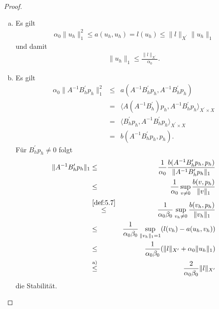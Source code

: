 \begin{proof}
    \begin{enumerate}[a)]
      \item
        Es gilt
        \begin{eqnarray*}
                \alpha_0 \|u_h\|_1^2
            \le a(u_h, u_h)
            = l(u_h)
            \le \|l\|_{X^\prime} \|u_h\|_1
        \end{eqnarray*}
        und damit
        \begin{eqnarray*}
            \|u_h\|_1 \le \frac{\|l\|_{X^\prime}}{\alpha_0}.
        \end{eqnarray*}
      \item
        Es gilt
        \begin{eqnarray*}
                  \alpha_0 \|A^{-1} B_h^\prime p_h\|_1^2
            &\le& a(A^{-1} B_h^\prime p_h, A^{-1} B_h^\prime p_h) \\
            &=& \langle A (A^{-1} B_h^\prime) p_h, A^{-1} B_h^\prime p_h \rangle
                _{X^\prime \times X} \\
            &=& \langle B_h^\prime p_h, A^{-1} B_h^\prime p_h \rangle
                _{X^\prime \times X} \\
            &=& b(A^{-1} B_h^\prime p_h, p_h).
        \end{eqnarray*}
        Für $B_h^\prime p_h \neq 0$ folgt
        \begin{eqnarray*}
                  \|A^{-1} B_h^\prime p_h\|_1
            &\le& \frac{1}{\alpha_0} \frac{b(A^{-1} B_h^\prime p_h, p_h)}
                  {\|A^{-1} B_h^\prime p_h\|_1} \\
            &\le& \frac{1}{\alpha_0} \sup_{v \neq 0} \frac{b(v, p_h)}{\|v\|_1}\\
            &\stackrel{\eqref{def:5.7}}{\le}&
                  \frac{1}{\alpha_0 \beta_0} \sup_{v_h \neq 0}
                  \frac{b(v_h, p_h)}{\|v_h\|_1} \\
            &\le& \frac{1}{\alpha_0 \beta_0} \sup_{\|v_h\|_1 = 1} (l(v_h) -
                  a(u_h, v_h)) \\
            &\le& \frac{1}{\alpha_0 \beta_0} (\|l\|_{X^\prime} +
                  \alpha_0 \|u_h\|_1) \\
            &\stackrel{\text{a)}}{\le}&
                  \frac{2}{\alpha_0 \beta_0} \|l\|_{X^\prime}
        \end{eqnarray*}
        die Stabilität.
    \end{enumerate}
\end{proof}


